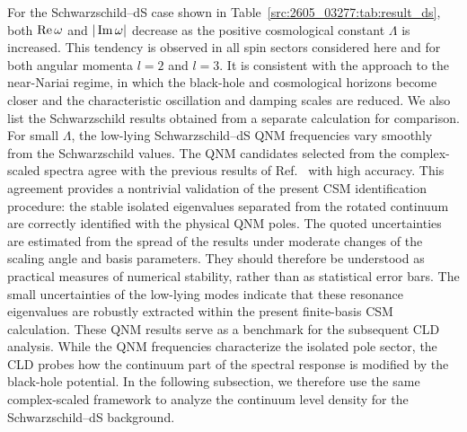 For the Schwarzschild--dS case shown in Table~\ref{src:2605_03277:tab:result_ds},
both \(\operatorname{Re}\omega\) and \(|\operatorname{Im}\omega|\) decrease as the positive cosmological
constant \(\Lambda\) is increased.
This tendency is observed in all spin sectors considered here and for both
angular momenta \(l=2\) and \(l=3\).
It is consistent with the approach to the near-Nariai regime, in which the
black-hole and cosmological horizons become closer and the characteristic
oscillation and damping scales are reduced.
We also list the Schwarzschild results obtained from a separate calculation
for comparison.
For small \(\Lambda\), the low-lying Schwarzschild--dS QNM frequencies vary
smoothly from the Schwarzschild values.
The QNM candidates selected from the complex-scaled spectra agree with the
previous results of Ref.~\cite{Zhidenko:2003wq} with high accuracy.
This agreement provides a nontrivial validation of the present CSM
identification procedure: the stable isolated eigenvalues separated from the
rotated continuum are correctly identified with the physical QNM poles.
The quoted uncertainties are estimated from the spread of the results under
moderate changes of the scaling angle and basis parameters.
They should therefore be understood as practical measures of numerical
stability, rather than as statistical error bars.
The small uncertainties of the low-lying modes indicate that these resonance
eigenvalues are robustly extracted within the present finite-basis CSM
calculation.
These QNM results serve as a benchmark for the subsequent CLD analysis.
While the QNM frequencies characterize the isolated pole sector, the CLD
probes how the continuum part of the spectral response is modified by the
black-hole potential.
In the following subsection, we therefore use the same complex-scaled
framework to analyze the continuum level density for the Schwarzschild--dS
background.
